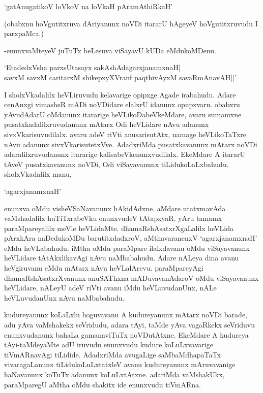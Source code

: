 \begin{shloka} 
`gatAnugatikoV loVkoV na loVkaH pAramAthiRkaH'
\end{shloka}

(obabxnu hoVgutitxruva dAriyanunx noVDi itararU hAgeyeV hoVgutitxruvudu I parxpaMca.)

-enunxvaMteyeV juTuTx beLesuva viSayavU kUDa eMdukoMDenu. 

\begin{shloka}
`EtadedxVsha parxsUtasayx sakAshAdagarxjanamxnaH|\\
savxM savxM caritarxM shikepxyXVranf paqthivAyxM savaRmAnavAH||'
\end{shloka}

I sholxVkadalilx heVLiruvudu kelavarige opipxge Agade irabahudu. Adare cenAnxgi vimasheR mADi noVDidare elalxrU idanunx opupxvaru. obabxru yAvudAdarU oMdanunx itararige heVLikoDabeVkeMdare, avaru sumamxne pusatxkadalilxruvudanunx mAtarx Odi heVLidare nAvu adanunx sivxVkarisuvudilalx. avaru adeV riVti anusarisutAtx, namage heVLikoTaTxre nAvu adanunx sivxVkarisutetxVve. AdadxriMda pusatxkavanunx mAtarx noVDi adaralilxruvudanunx itararige kalisabeVkenunxvudilalx. EkeMdare A itararU tAveV pusatxkavanunx noVDi, Odi viSayavanunx tiLidukoLaLxbahudu. sholxVkadalilx manu, 

\begin{shloka}
`agarxjanamxnaH'
\end{shloka}
 
enunxva oMdu visheVSaNavanunx hAkidAdxne. aMdare utatxmavAda vaMshadalilx huTiTxrabeVku enunxvudeV tAtapxyaR. yAru tamamx paraMpareyalilx meVle heVLidaMte. dhamaRshAsatxrXgaLalilx heVLida pArxkAra naDedukoMDu barutitxdadxroV, aMthavaranenxV `agarxjanamxnaH' eMdu heVLabahudu. iMtha oMdu paraMpare ilalxdavanu oMdu viSayavanunx heVLidare tAtAkxlikavAgi nAvu naMbabahudu. Adare nALeya dina avanu heVgiruvanu eMdu mAtarx nAvu heVLalArevu. paraMpareyAgi dhamaRshAsatxrXvanunx anuSAThxna mADuvavanAdaroV oMdu viSayavanunx heVLidare, nALeyU adeV riVti avanu iMdu heVLuvudanUnx, nALe heVLuvudanUnx nAvu naMbabahudu.

kudureyanunx koLaLxlu hoguvavanu A kudureyanunx mAtarx noVDi barade, adu yAva vaMshakekx seVridudu, adara tAyi, taMde yAva vagaRkekx seVriduvu enunxvudanunx bahaLa gamanaviTuTx noVDutAtxne. EkeMdare A kudureya tAyi-taMdeyaMte adU iruvudu enunxvudu kudure koLuLxvavarige tiVmARnavAgi tiLidide. AdadxriMda avugaLige saMbaMdhapaTaTx vivaragaLanunx tiLidukoLuLxtatxleV avanu kudureyanunx mAruvavanige haNavanunx koTuTx adanunx koLuLxtAtxne. adariMda vaMshakUkx, paraMparegU aMtha oMdu shakitx ide enunxvudu tiVmARna.

